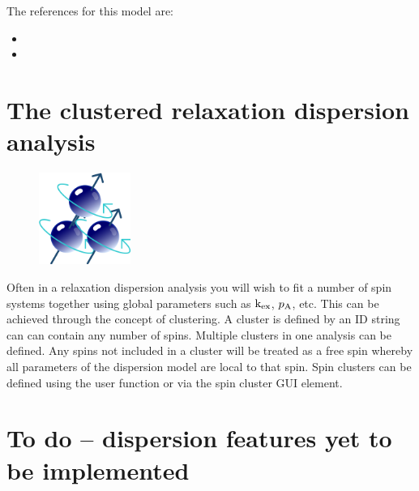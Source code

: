 The references for this model are:
\begin{itemize}
\item {}
\item {}
\end{itemize}




\section{The clustered relaxation dispersion analysis}

\begin{figure}[h]
\includegraphics[width=3cm, bb=14 14 399 399]{graphics/misc/cluster_600x600}
\end{figure}

Often in a relaxation dispersion analysis you will wish to fit a number of spin systems together using global parameters such as $\textrm{k}_\textrm{ex}$, $p_\textrm{A}$, etc.
This can be achieved through the concept of clustering.
A cluster is defined by an ID string can can contain any number of spins.
Multiple clusters in one analysis can be defined.
Any spins not included in a cluster will be treated as a free spin whereby all parameters of the dispersion model are local to that spin.
Spin clusters can be defined using the  user function or via the spin cluster GUI element.




\section{To do -- dispersion features yet to be implemented}
\label{sect: dispersion: TODO}


